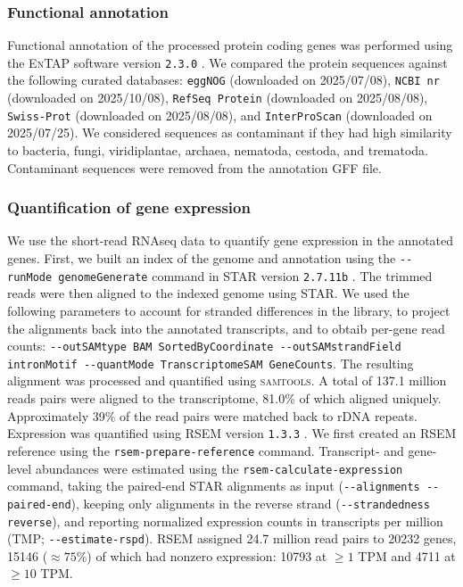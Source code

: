 \subsubsection*{Functional annotation}

Functional annotation of the processed protein coding genes was performed using the
\textsc{EnTAP} software version \texttt{2.3.0} \citep{hart_span_2020}.
We compared the \bgla{} protein sequences against the following curated databases:
\texttt{eggNOG} (downloaded on 2025/07/08), \texttt{NCBI nr} (downloaded on 2025/10/08),
\texttt{RefSeq Protein} (downloaded on 2025/08/08), \texttt{Swiss-Prot}
(downloaded on 2025/08/08), and \texttt{InterProScan} (downloaded on 2025/07/25).
We considered sequences as contaminant if they had high similarity to bacteria, fungi,
viridiplantae, archaea, nematoda, cestoda, and trematoda.
Contaminant sequences were removed from the annotation GFF file.

\subsubsection*{Quantification of gene expression}\label{sec:gene_expression}

We use the short-read RNAseq data to quantify gene expression in the annotated genes.
First, we built an index of the genome and annotation using the \texttt{-{}-runMode
genomeGenerate} command in \textsc{STAR} version \texttt{2.7.11b} \citep{dobin_star_2013}.
The trimmed reads were then aligned to the indexed genome using \textsc{STAR}.
We used the following parameters to account for stranded differences in the library,
to project the alignments back into the annotated transcripts, and to obtaib per-gene
read counts: \texttt{-{}-outSAMtype BAM SortedByCoordinate -{}-outSAMstrandField intronMotif
-{}-quantMode TranscriptomeSAM GeneCounts}.
The resulting alignment was processed and quantified using \textsc{samtools}.
A total of 137.1 million reads pairs were aligned to the transcriptome, 81.0\% of
which aligned uniquely.
Approximately 39\% of the read pairs were matched back to rDNA repeats.
Expression was quantified using \textsc{RSEM} version \texttt{1.3.3} \citep{li_rsem_2011}.
We first created an \textsc{RSEM} reference using the \texttt{rsem-prepare-reference}
command.
Transcript- and gene-level abundances were estimated using the \texttt{rsem-calculate-expression}
command, taking the paired-end \textsc{STAR} alignments as input (\texttt{-{}-alignments
-{}-paired-end}), keeping only alignments in the reverse strand (\texttt{-{}-strandedness
reverse}), and reporting normalized expression counts in transcripts per million (TMP;
\texttt{-{}-estimate-rspd}).
\textsc{RSEM} assigned 24.7 million read pairs to \num{20232} \bgla{} genes, \num{15146}
($\approx75\%$) of which had nonzero expression: \num{10793} at $\geq1$ TPM and \num{4711}
at $\geq10$ TPM.

